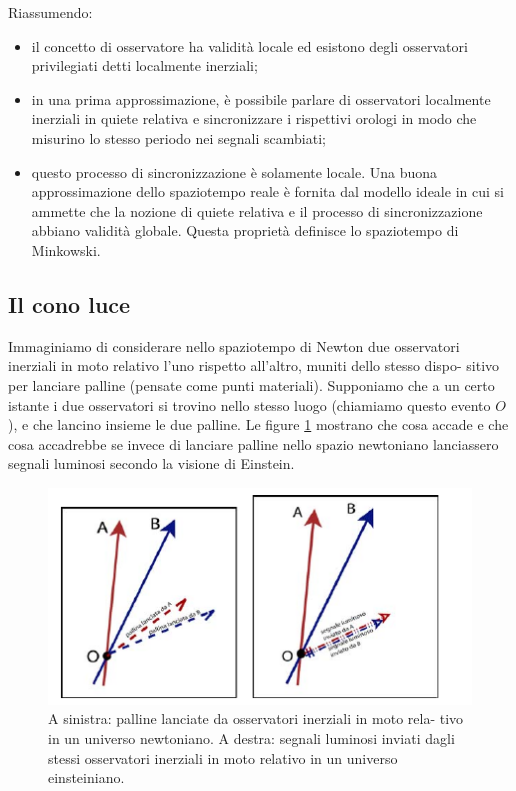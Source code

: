 Riassumendo:
\begin{itemize}
 \item il concetto di osservatore ha validità locale ed esistono degli osservatori
privilegiati detti localmente inerziali;
 \item in una prima approssimazione, è possibile parlare di osservatori localmente 
inerziali in quiete relativa e sincronizzare i rispettivi orologi in 
modo che misurino lo stesso periodo nei segnali scambiati;
 \item questo processo di sincronizzazione è solamente locale. Una buona
approssimazione dello spaziotempo reale è fornita dal modello ideale
in cui si ammette che la nozione di quiete relativa e il processo di
sincronizzazione abbiano validità globale. Questa proprietà definisce lo
spaziotempo di Minkowski.

\end{itemize}

\subsection{Il cono luce}

Immaginiamo di considerare nello spaziotempo di Newton due osservatori
inerziali in moto relativo l'uno rispetto all'altro, muniti dello stesso dispo-
sitivo per lanciare palline (pensate come punti materiali). Supponiamo che
a un certo istante i due osservatori si trovino nello stesso luogo (chiamiamo
questo evento $O$), e che lancino insieme le due palline. Le figure \ref{palline_raggi}
mostrano che cosa accade e che cosa accadrebbe se invece di lanciare pal\-line 
nello spazio newtoniano lanciassero segnali luminosi secondo la visione
di Einstein.

\begin{figure}[htbp]\label{palline_raggi}
   \centering
   \includegraphics[scale=1]{immagini/minkowski/palline_raggi}
   \caption{A sinistra: palline lanciate da osservatori inerziali in moto rela-
tivo in un universo newtoniano. A destra: segnali luminosi inviati dagli stessi
osservatori inerziali in moto relativo in un universo einsteiniano.}
\end{figure}

